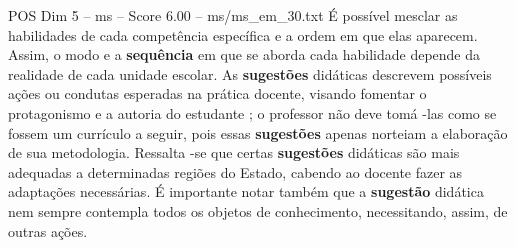 \begin{textsample}{POS Dim 5 – ms – Score 6.00 – ms/ms\_em\_30.txt}
É possível mesclar as habilidades de cada competência específica e a ordem em que elas aparecem.
Assim, o modo e a \textbf{sequência} em que se aborda cada habilidade depende da realidade de cada unidade escolar.
As \textbf{sugestões} didáticas descrevem possíveis ações ou condutas esperadas na prática docente, visando fomentar o protagonismo e a autoria do estudante ; o professor não deve tomá -las como se fossem um currículo a seguir, pois essas \textbf{sugestões} apenas norteiam a elaboração de sua metodologia.
Ressalta -se que certas \textbf{sugestões} didáticas são mais adequadas a determinadas regiões do Estado, cabendo ao docente fazer as adaptações necessárias.
É importante notar também que a \textbf{sugestão} didática nem sempre contempla todos os objetos de conhecimento, necessitando, assim, de outras ações.

\end{textsample}
